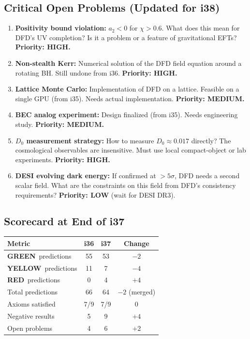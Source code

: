 \documentclass[11pt,a4paper]{article}
\newcommand{\GREEN}{\textcolor{dfdgreen}{\textbf{GREEN}}}
\newcommand{\YELLOW}{\textcolor{dfdyellow}{\textbf{YELLOW}}}
\newcommand{\RED}{\textcolor{dfdred}{\textbf{RED}}}
\begin{document}
\subsection{Critical Open Problems (Updated for i38)}

\begin{enumerate}
\item \textbf{Positivity bound violation:} $a_2 < 0$ for $\chi > 0.6$. What does this mean for DFD's UV completion? Is it a problem or a feature of gravitational EFTs? \textbf{Priority: HIGH.}

\item \textbf{Non-stealth Kerr:} Numerical solution of the DFD field equation around a rotating BH. Still undone from i36. \textbf{Priority: HIGH.}

\item \textbf{Lattice Monte Carlo:} Implementation of DFD on a lattice. Feasible on a single GPU (from i35). Needs actual implementation. \textbf{Priority: MEDIUM.}

\item \textbf{BEC analog experiment:} Design finalized (from i35). Needs engineering study. \textbf{Priority: MEDIUM.}

\item \textbf{$D_0$ measurement strategy:} How to measure $D_0 \approx 0.017$ directly? The cosmological observables are insensitive. Must use local compact-object or lab experiments. \textbf{Priority: HIGH.}

\item \textbf{DESI evolving dark energy:} If confirmed at $>5\sigma$, DFD needs a second scalar field. What are the constraints on this field from DFD's consistency requirements? \textbf{Priority: LOW} (wait for DESI DR3).
\end{enumerate}

\subsection{Scorecard at End of i37}

\begin{center}
\begin{tabular}{lccc}
\toprule
\textbf{Metric} & \textbf{i36} & \textbf{i37} & \textbf{Change} \\
\midrule
\GREEN\ predictions & 55 & 53 & $-2$ \\
\YELLOW\ predictions & 11 & 7 & $-4$ \\
\RED\ predictions & 0 & 4 & $+4$ \\
Total predictions & 66 & 64 & $-2$ (merged) \\
\midrule
Axioms satisfied & 7/9 & 7/9 & 0 \\
Negative results & 5 & 9 & $+4$ \\
Open problems & 4 & 6 & $+2$ \\
\bottomrule
\end{tabular}
\end{center}
\end{document}
